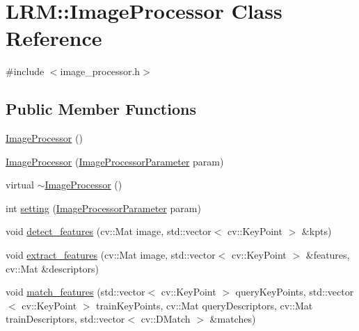 \hypertarget{classLRM_1_1ImageProcessor}{\section{\-L\-R\-M\-:\-:\-Image\-Processor \-Class \-Reference}
\label{classLRM_1_1ImageProcessor}
}


{\ttfamily \#include $<$image\-\_\-processor.\-h$>$}

\subsection*{\-Public \-Member \-Functions}
\begin{DoxyCompactItemize}
\item 
\hyperlink{classLRM_1_1ImageProcessor_a2ba3327bb0b08a0602a2c293f802a1af}{\-Image\-Processor} ()
\item 
\hyperlink{classLRM_1_1ImageProcessor_ac9903b540fedc1fee0c6f4d0a2c42c68}{\-Image\-Processor} (\hyperlink{classLRM_1_1ImageProcessorParameter}{\-Image\-Processor\-Parameter} param)
\item 
virtual \hyperlink{classLRM_1_1ImageProcessor_aa6bdf7e699cdd2b5531a27eddfc0c93a}{$\sim$\-Image\-Processor} ()
\item 
int \hyperlink{classLRM_1_1ImageProcessor_aa5ddc6b267ccb4afcb3871fc730f2c93}{setting} (\hyperlink{classLRM_1_1ImageProcessorParameter}{\-Image\-Processor\-Parameter} param)
\item 
void \hyperlink{classLRM_1_1ImageProcessor_aa2d39abc2246936ab5cfc35ecde020fe}{detect\-\_\-features} (cv\-::\-Mat image, std\-::vector$<$ cv\-::\-Key\-Point $>$ \&kpts)
\item 
void \hyperlink{classLRM_1_1ImageProcessor_adb6fe6e1383ede9271232b7f96ea7699}{extract\-\_\-features} (cv\-::\-Mat image, std\-::vector$<$ cv\-::\-Key\-Point $>$ \&features, cv\-::\-Mat \&descriptors)
\item 
void \hyperlink{classLRM_1_1ImageProcessor_a052b76bc4809897573ac3a0a3bf11ca8}{match\-\_\-features} (std\-::vector$<$ cv\-::\-Key\-Point $>$ query\-Key\-Points, std\-::vector$<$ cv\-::\-Key\-Point $>$ train\-Key\-Points, cv\-::\-Mat query\-Descriptors, cv\-::\-Mat train\-Descriptors, std\-::vector$<$ cv\-::\-D\-Match $>$ \&matches)
\end{DoxyCompactItemize}
